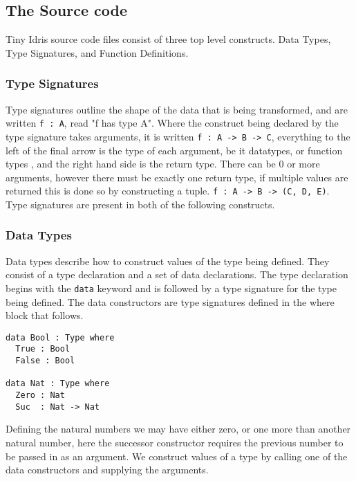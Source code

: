 \documentclass[a4paper]{article}
\begin{document}
\subsection{The Source code}
\label{sec:org6a24b1a}
Tiny Idris source code files consist of three top level constructs.
Data Types, Type Signatures, and Function Definitions. 
\subsubsection{Type Signatures}
\label{sec:orga47dfce}
Type signatures outline the shape of the data that is being transformed, and are written \texttt{f : A}, read "f has type A".
Where the construct being declared by the type signature takes arguments, it is written \texttt{f : A -> B -> C},
everything to the left of the final arrow is the type of each argument, be it datatypes, or function types
, and the right hand side is the return type. There can be 0 or more arguments, however there must be exactly one return type,
if multiple values are returned this is done so by constructing a tuple. \texttt{f : A -> B -> (C, D, E)}.
Type signatures are present in both of the following constructs.

\subsubsection{Data Types}
\label{sec:orge9ae344}
Data types describe how to construct values of the type being defined. They consist of a type declaration and
 a set of data declarations. The type declaration begins with the \texttt{data} keyword and is followed by
a type signature for the type being defined. The data constructors are type signatures defined in the where block
that follows. 

\begin{center}
\begin{verbatim}
data Bool : Type where
  True : Bool
  False : Bool

data Nat : Type where
  Zero : Nat
  Suc  : Nat -> Nat
\end{verbatim}
\end{center}

Defining the natural numbers we may have either zero, or one more than another natural number, 
here the successor constructor requires the previous number to be passed in as an argument.
We construct values of a type by calling one of the data constructors and supplying the arguments.
\end{document}

